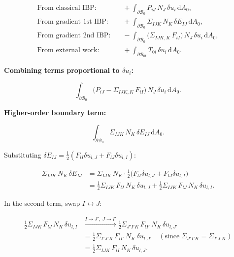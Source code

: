 \documentclass[11pt]{article}
\begin{document}
\begin{align}
\text{From classical IBP:}&\quad
+\int_{\partial\mathcal{B}_{0}}P_{iJ}\,N_{J}\,\delta u_{i}\,
  \mathrm{d}A_{0},
\\
\text{From gradient 1st IBP:}&\quad
+\int_{\partial\mathcal{B}_{0}}\Sigma_{IJK}\,N_{K}\,
  \delta E_{IJ}\,\mathrm{d}A_{0},
\\
\text{From gradient 2nd IBP:}&\quad
-\int_{\partial\mathcal{B}_{0}}\bigl(\Sigma_{IJK,K}\,F_{iI}\bigr)\,
  N_{J}\,\delta u_{i}\,\mathrm{d}A_{0},
\\
\text{From external work:}&\quad
+\int_{\partial\mathcal{B}_{0t}}\bar{T}_{0i}\,\delta u_{i}\,
  \mathrm{d}A_{0}.
\end{align}

\textbf{Combining terms proportional to $\delta u_{i}$:}

\begin{equation}
\int_{\partial\mathcal{B}_{0}}
\bigl(P_{iJ} - \Sigma_{IJK,K}\,F_{iI}\bigr)\,N_{J}\,
\delta u_{i}\,\mathrm{d}A_{0}.
\end{equation}

\textbf{Higher-order boundary term:}

\begin{equation}
\int_{\partial\mathcal{B}_{0}}\Sigma_{IJK}\,N_{K}\,
  \delta E_{IJ}\,\mathrm{d}A_{0}.
\end{equation}

Substituting $\delta E_{IJ} = \tfrac12(F_{lI}\delta u_{l,J}+F_{lJ}\delta u_{l,I})$:

\begin{align}
\Sigma_{IJK}\,N_{K}\,\delta E_{IJ}
&= \Sigma_{IJK}\,N_{K}\cdot\tfrac12\bigl(F_{lI}\delta u_{l,J}
                                      + F_{lJ}\delta u_{l,I}\bigr)
\nonumber\\
&= \tfrac12\Sigma_{IJK}\,F_{lI}\,N_{K}\,\delta u_{l,J}
 + \tfrac12\Sigma_{IJK}\,F_{lJ}\,N_{K}\,\delta u_{l,I}.
\end{align}

In the second term, swap $I\leftrightarrow J$:

\begin{align}
\tfrac12\Sigma_{IJK}\,F_{lJ}\,N_{K}\,\delta u_{l,I}
&\xrightarrow{I\to J',\;J\to I'}
\tfrac12\Sigma_{J'I'K}\,F_{lI'}\,N_{K}\,\delta u_{l,J'}
\nonumber\\
&= \tfrac12\Sigma_{I'J'K}\,F_{lI'}\,N_{K}\,\delta u_{l,J'}
\quad(\text{since }\Sigma_{J'I'K}=\Sigma_{I'J'K})
\nonumber\\
&= \tfrac12\Sigma_{IJK}\,F_{lI}\,N_{K}\,\delta u_{l,J}.
\end{align}
\end{document}
